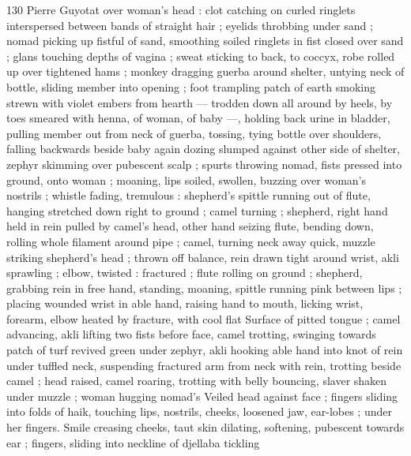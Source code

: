 130 Pierre Guyotat
over woman's head : clot catching on curled ringlets interspersed
between bands of straight hair ; eyelids throbbing under sand ;
nomad picking up fistful of sand, smoothing soiled ringlets in fist
closed over sand ; glans touching depths of vagina ; sweat sticking
to back, to coccyx, robe rolled up over tightened hams ; monkey
dragging guerba around shelter, untying neck of bottle, sliding
member into opening ; foot trampling patch of earth smoking strewn
with violet embers from hearth — trodden down all around by heels,
by toes smeared with henna, of woman, of baby —, holding back
urine in bladder, pulling member out from neck of guerba, tossing,
tying bottle over shoulders, falling backwards beside baby again
dozing slumped against other side of shelter, zephyr skimming over
pubescent scalp ; spurts throwing nomad, fists pressed into ground,
onto woman ; moaning, lips soiled, swollen, buzzing over woman's
nostrils ; whistle fading, tremulous : shepherd's spittle running out
of flute, hanging stretched down right to ground ; camel turning ;
shepherd, right hand held in rein pulled by camel's head, other hand
seizing flute, bending down, rolling whole filament around pipe ;
camel, turning neck away quick, muzzle striking shepherd's head ;
thrown off balance, rein drawn tight around wrist, akli sprawling ;
elbow, twisted : fractured ; flute rolling on ground ; shepherd,
grabbing rein in free hand, standing, moaning, spittle running pink
between lips ; placing wounded wrist in able hand, raising hand to
mouth, licking wrist, forearm, elbow heated by fracture, with cool flat
Surface of pitted tongue ; camel advancing, akli lifting two fists
before face, camel trotting, swinging towards patch of turf revived
green under zephyr, akli hooking able hand into knot of rein under
tuffled neck, suspending fractured arm from neck with rein, trotting
beside camel ; head raised, camel roaring, trotting with belly
bouncing, slaver shaken under muzzle ; woman hugging nomad’s
Veiled head against face ; fingers sliding into folds of haik, touching
lips, nostrils, cheeks, loosened jaw, ear-lobes ; under her fingers.
Smile creasing cheeks, taut skin dilating, softening, pubescent
towards ear ; fingers, sliding into neckline of djellaba tickling

